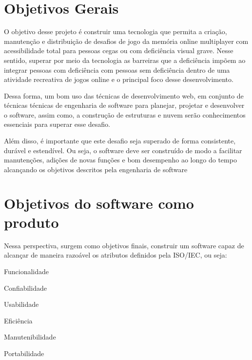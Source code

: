 \section{Objetivos Gerais}

O objetivo desse projeto é construir uma tecnologia que permita a criação, manutenção e distribuição de desafios de jogo da memória online multiplayer com acessibilidade total para pessoas cegas ou com deficiência visual grave. Nesse sentido, superar por meio da tecnologia as barreiras que a deficiência impõem ao integrar pessoas com deficiência com pessoas sem deficiência dentro de uma atividade recreativa de jogos online e o principal foco desse desenvolvimento.

Dessa forma, um bom uso das técnicas de desenvolvimento web, em conjunto de técnicas técnicas de engenharia de software para planejar, projetar e desenvolver o software, assim como, a construção de estruturas e nuvem serão conhecimentos essenciais para superar esse desafio.

Além disso, é importante que este desafio seja superado de forma consistente, durável e estendível. Ou seja, o software deve ser construído de modo a facilitar manutenções, adições de novas funções e bom desempenho ao longo do tempo alcançando os objetivos descritos pela engenharia de software

\section{Objetivos do software como produto}

Nessa perspectiva, surgem como objetivos finais, construir um software capaz de alcançar de maneira razoável os atributos definidos pela ISO/IEC, ou seja: \cite{ISO/IEC9126}

\begin{alineascomponto}
  \item Funcionalidade
  \item Confiabilidade
  \item Usabilidade
  \item Eficiência
  \item Manutenibilidade
  \item Portabilidade
\end{alineascomponto}


